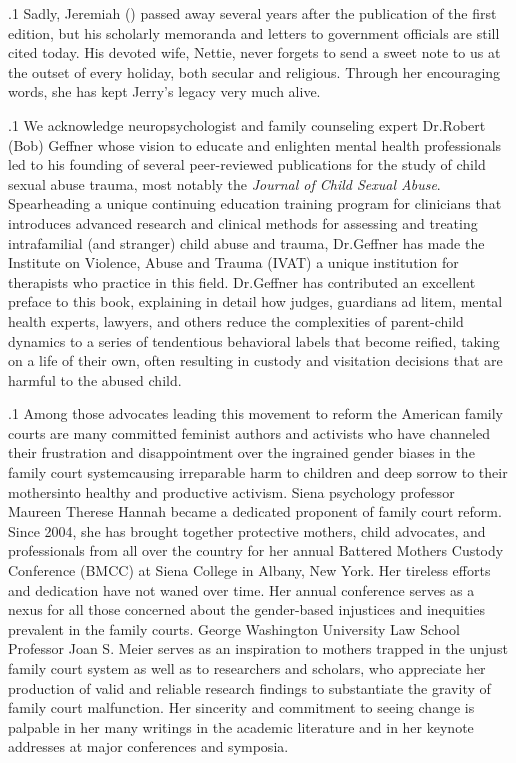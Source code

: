 \documentclass[11pt, twoside]{article}
\begin{document}
{\p.1{%
Sadly, Jeremiah () passed away several years after the publication of the first edition, but his scholarly memoranda and letters to
government officials are still cited today. His devoted wife, Nettie, never
forgets to send a sweet note to us at the outset of every holiday, both secular and religious. Through her encouraging words, she has kept Jerry’s
legacy very much alive.
}%

\p.1{%
We acknowledge neuropsychologist and family counseling expert Dr.\@ Robert
(Bob) Geffner whose vision to educate and enlighten mental
health professionals led to his founding of several peer-reviewed publications for the study of child sexual abuse trauma, most notably the \textit{Journal
of Child Sexual Abuse}. Spearheading a unique continuing education
training program for clinicians that introduces advanced research and
clinical methods for assessing and treating intrafamilial (and stranger)
child abuse and trauma, Dr.\@ Geffner has made the Institute on Violence,
Abuse and Trauma (IVAT) a unique institution for therapists who practice in this field. Dr.\@ Geffner has contributed an excellent preface to this
book, explaining in detail how judges, guardians ad litem, mental health
experts, lawyers, and others reduce the complexities of parent-child dynamics to a series of tendentious behavioral labels that become reified,
taking on a life of their own, often resulting in custody and visitation
decisions that are harmful to the abused child.
}%

\p.1{%
Among those advocates leading this movement to reform the American family courts are many committed feminist authors and activists
who have channeled their frustration and disappointment over the ingrained gender biases in the family court system\mdash{}causing irreparable
harm to children and deep sorrow to their mothers\mdash{}into healthy and
productive activism. Siena psychology professor Maureen  Therese
Hannah became a dedicated proponent of family court reform. Since
2004, she has brought together protective mothers, child advocates, and
professionals from all over the country for her annual Battered Mothers Custody Conference (BMCC) at Siena College in Albany, New York.
Her tireless efforts and dedication have not waned over time. Her annual conference serves as a nexus for all those concerned about the
gender-based injustices and inequities prevalent in the family courts.
George Washington University Law School Professor Joan S. Meier
serves as an inspiration to mothers trapped in the unjust family court
system as well as to researchers and scholars, who appreciate her production of valid and reliable research findings to substantiate the gravity
of family court malfunction. Her sincerity and commitment to seeing
change is palpable in her many writings in the academic literature and
in her keynote addresses at major conferences and symposia.
}%

}
\end{document}
